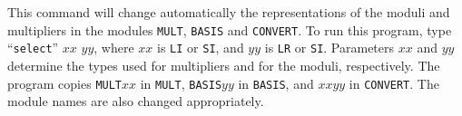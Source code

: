 
This command will change automatically the representations of the
moduli and multipliers in the modules {\tt MULT}, {\tt BASIS} and
{\tt CONVERT}. To run this program, type ``{\tt select}'' $xx$ $yy$, where
$xx$ is {\tt LI} or {\tt SI}, and $yy$ is {\tt LR} or {\tt SI}.
Parameters $xx$ and $yy$  determine the types used for multipliers and for 
the moduli, respectively.
The program copies {\tt MULT}$xx$ in {\tt MULT}, {\tt BASIS}$yy$ in
{\tt BASIS}, and $xxyy$ in {\tt CONVERT}. 
The module names are also changed appropriately.
